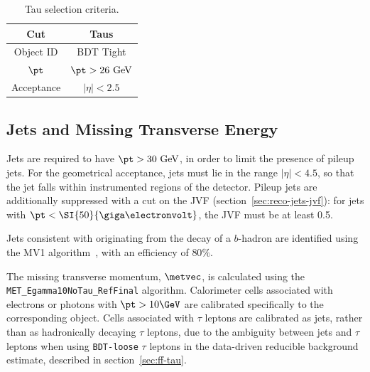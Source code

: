 \begin{table}[h]
	\centering
		\begin{tabular}{cc}
			Cut & Taus \\
			\hline
			Object ID & BDT Tight \\
			$\pt$ & $\pt>26~\mbox{GeV}$ \\
			Acceptance & $|\eta|<2.5$ \\
		\end{tabular}
	\caption{Tau selection criteria.}
	\label{table:tau-selections}
\end{table}

\subsection{Jets and Missing Transverse Energy}\label{sec:model-independent-jets-met}


Jets are required to have $\pt>30~\mbox{GeV}$, in order to limit the presence of pileup jets. For the geometrical acceptance, jets must lie in the range $|\eta|<4.5$, so that the jet falls within instrumented regions of the detector. Pileup jets are additionally suppressed with a cut on the JVF (section~\ref{sec:reco-jets-jvf}): for jets with $\pt<\SI{50}{\giga\electronvolt}$, the JVF must be at least 0.5. 

Jets consistent with originating from the decay of a $b$-hadron are identified using the MV1 algorithm~\cite{TheATLASCollaboration:2014vj}, with an efficiency of $80\%$. 

The missing transverse momentum, $\metvec$, is calculated using the \texttt{MET\_Egamma10NoTau\_RefFinal} algorithm. Calorimeter cells associated with electrons or photons with $\pt>10 \GeV$ are calibrated specifically to the corresponding object. Cells associated with $\tau$ leptons are calibrated as jets, rather than as hadronically decaying $\tau$ leptons, due to the ambiguity between jets and $\tau$ leptons when using \texttt{BDT-loose} $\tau$ leptons in the data-driven reducible background estimate, described in section~\ref{sec:ff-tau}. 



